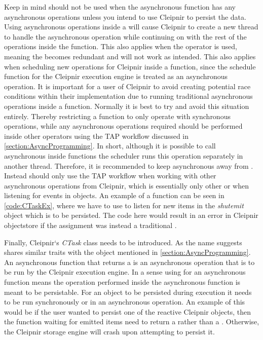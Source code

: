 Keep in mind  should not be used when the asynchronous function has any asynchronous operations unless you intend to use Cleipnir to persist the data. Using asynchronous operations inside a  will cause Cleipnir to create a new thread to handle the asynchronous operation while continuing on with the rest of the operations inside the function. This also applies when the  operator is used, meaning the  becomes redundant and will not work as intended. This also applies when scheduling new operations for Cleipnir inside a  function, since the schedule function for the Cleipnir execution engine is treated as an asynchronous operation. It is important for a user of Cleipnir to avoid creating potential race conditions within their implementation due to running traditional asynchronous operations inside a  function. Normally it is best to try and avoid this situation entirely. Thereby restricting a  function to only operate with synchronous operations, while any asynchronous operations required should be performed inside other  operators using the TAP workflow discussed in \autoref{section:AsyncProgramming}. In short, although it is possible to call asynchronous  inside  functions the scheduler runs this operation separately in another thread. Therefore, it is recommended to keep asynchronous  away from . Instead  should only use the TAP workflow when working with other asynchronous operations from Cleipnir, which is essentially only other  or when listening for events in  objects. An example of a  function can be seen in \autoref{code:CTaskEx}, where we have to use  to listen for new items in the \emph{shutemit}  object which is to be persisted. The code here would result in an error in Cleipnir objectstore if the  assignment was instead a traditional .
\fi

Finally, Cleipnir`s \emph{CTask} class needs to be introduced. As the name suggests  shares similar traits with the  object mentioned in \autoref{section:AsyncProgramming}. An asynchronous function that returns a  is an asynchronous operation that is to be run by the Cleipnir execution engine. In a sense using  for an asynchronous function means the operation performed inside the asynchronous function is meant to be persistable. For an object to be persisted during execution it needs to be run synchronously or in an asynchronous  operation. An example of this would be if the user wanted to persist one of the reactive Cleipnir  objects, then the function waiting for emitted items need to return a  rather than a . Otherwise, the Cleipnir storage engine will crash upon attempting to persist it.

